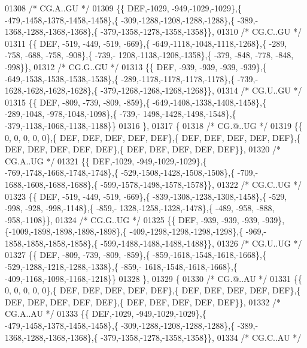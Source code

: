 \begin{DoxyCode}
01308 \textcolor{comment}{/* CG.A..GU */}
01309 \{\{  DEF,-1029, -949,-1029,-1029\},\{ -479,-1458,-1378,-1458,-1458\},\{ -309,-1288,-1208,-1288,-1288\},\{ -389,-
      1368,-1288,-1368,-1368\},\{ -379,-1358,-1278,-1358,-1358\}\},
01310 \textcolor{comment}{/* CG.C..GU */}
01311 \{\{  DEF, -519, -449, -519, -669\},\{ -649,-1118,-1048,-1118,-1268\},\{ -289, -758, -688, -758, -908\},\{ -739,-
      1208,-1138,-1208,-1358\},\{ -379, -848, -778, -848, -998\}\},
01312 \textcolor{comment}{/* CG.G..GU */}
01313 \{\{  DEF, -939, -939, -939, -939\},\{ -649,-1538,-1538,-1538,-1538\},\{ -289,-1178,-1178,-1178,-1178\},\{ -739,-
      1628,-1628,-1628,-1628\},\{ -379,-1268,-1268,-1268,-1268\}\},
01314 \textcolor{comment}{/* CG.U..GU */}
01315 \{\{  DEF, -809, -739, -809, -859\},\{ -649,-1408,-1338,-1408,-1458\},\{ -289,-1048, -978,-1048,-1098\},\{ -739,-
      1498,-1428,-1498,-1548\},\{ -379,-1138,-1068,-1138,-1188\}\}
01316 \},
01317 \{
01318 \textcolor{comment}{/* CG.@..UG */}
01319 \{\{    0,    0,    0,    0,    0\},\{  DEF,  DEF,  DEF,  DEF,  DEF\},\{  DEF,  DEF,  DEF,  DEF,  DEF\},\{  DEF,  
      DEF,  DEF,  DEF,  DEF\},\{  DEF,  DEF,  DEF,  DEF,  DEF\}\},
01320 \textcolor{comment}{/* CG.A..UG */}
01321 \{\{  DEF,-1029, -949,-1029,-1029\},\{ -769,-1748,-1668,-1748,-1748\},\{ -529,-1508,-1428,-1508,-1508\},\{ -709,-
      1688,-1608,-1688,-1688\},\{ -599,-1578,-1498,-1578,-1578\}\},
01322 \textcolor{comment}{/* CG.C..UG */}
01323 \{\{  DEF, -519, -449, -519, -669\},\{ -839,-1308,-1238,-1308,-1458\},\{ -529, -998, -928, -998,-1148\},\{ -859,-
      1328,-1258,-1328,-1478\},\{ -489, -958, -888, -958,-1108\}\},
01324 \textcolor{comment}{/* CG.G..UG */}
01325 \{\{  DEF, -939, -939, -939, -939\},\{-1009,-1898,-1898,-1898,-1898\},\{ -409,-1298,-1298,-1298,-1298\},\{ -969,-
      1858,-1858,-1858,-1858\},\{ -599,-1488,-1488,-1488,-1488\}\},
01326 \textcolor{comment}{/* CG.U..UG */}
01327 \{\{  DEF, -809, -739, -809, -859\},\{ -859,-1618,-1548,-1618,-1668\},\{ -529,-1288,-1218,-1288,-1338\},\{ -859,-
      1618,-1548,-1618,-1668\},\{ -409,-1168,-1098,-1168,-1218\}\}
01328 \},
01329 \{
01330 \textcolor{comment}{/* CG.@..AU */}
01331 \{\{    0,    0,    0,    0,    0\},\{  DEF,  DEF,  DEF,  DEF,  DEF\},\{  DEF,  DEF,  DEF,  DEF,  DEF\},\{  DEF,  
      DEF,  DEF,  DEF,  DEF\},\{  DEF,  DEF,  DEF,  DEF,  DEF\}\},
01332 \textcolor{comment}{/* CG.A..AU */}
01333 \{\{  DEF,-1029, -949,-1029,-1029\},\{ -479,-1458,-1378,-1458,-1458\},\{ -309,-1288,-1208,-1288,-1288\},\{ -389,-
      1368,-1288,-1368,-1368\},\{ -379,-1358,-1278,-1358,-1358\}\},
01334 \textcolor{comment}{/* CG.C..AU */}

\end{DoxyCode}
